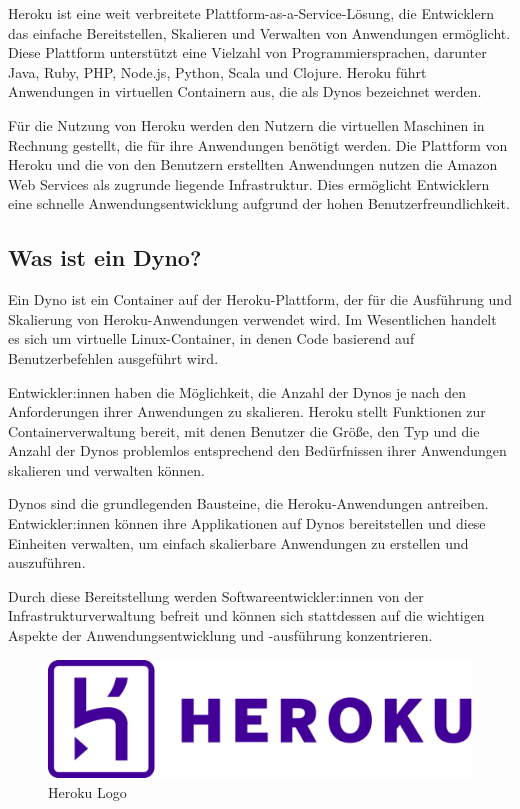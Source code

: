 Heroku ist eine weit verbreitete Plattform-as-a-Service-Lösung, die Entwicklern das einfache Bereitstellen, Skalieren und Verwalten von Anwendungen ermöglicht. Diese Plattform unterstützt eine Vielzahl von Programmiersprachen, darunter Java, Ruby, PHP, Node.js, Python, Scala und Clojure. Heroku führt Anwendungen in virtuellen Containern aus, die als Dynos bezeichnet werden.

Für die Nutzung von Heroku werden den Nutzern die virtuellen Maschinen in Rechnung gestellt, die für ihre Anwendungen benötigt werden. Die Plattform von Heroku und die von den Benutzern erstellten Anwendungen nutzen die Amazon Web Services als zugrunde liegende Infrastruktur. Dies ermöglicht Entwicklern eine schnelle Anwendungsentwicklung aufgrund der hohen Benutzerfreundlichkeit.
\newpage
\subsection{Was ist ein Dyno?}

Ein Dyno ist ein Container auf der Heroku-Plattform, der für die Ausführung und Skalierung von Heroku-Anwendungen verwendet wird. Im Wesentlichen handelt es sich um virtuelle Linux-Container, in denen Code basierend auf Benutzerbefehlen ausgeführt wird.

Entwickler:innen haben die Möglichkeit, die Anzahl der Dynos je nach den Anforderungen ihrer Anwendungen zu skalieren. Heroku stellt Funktionen zur Containerverwaltung bereit, mit denen Benutzer die Größe, den Typ und die Anzahl der Dynos problemlos entsprechend den Bedürfnissen ihrer Anwendungen skalieren und verwalten können.

Dynos sind die grundlegenden Bausteine, die Heroku-Anwendungen antreiben. Entwickler:innen können ihre Applikationen auf Dynos bereitstellen und diese Einheiten verwalten, um einfach skalierbare Anwendungen zu erstellen und auszuführen.

Durch diese Bereitstellung werden Softwareentwickler:innen von der Infrastrukturverwaltung befreit und können sich stattdessen auf die wichtigen Aspekte der Anwendungsentwicklung und -ausführung konzentrieren.

\begin{figure}[h!]
    \centering
    \includegraphics[width=0.7\linewidth]{pics/heroku.png}
    \caption{Heroku Logo}
    \label{fig:enter-label}
\end{figure}
